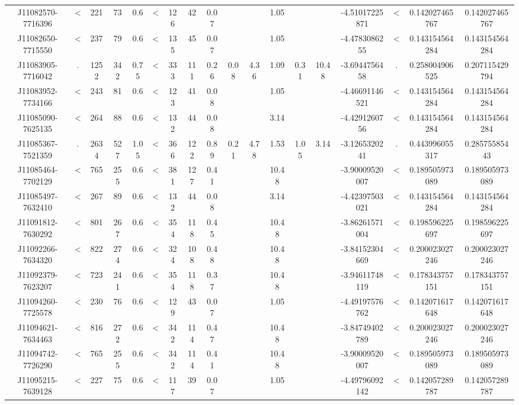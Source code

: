 \begin{table}
\begin{tabular}{cccccccccccccccccc}
J11082570-7716396 & < & 221 & 73 & 0.6 & < & 126 & 42 & 0.07 &  &  & 1.05 &  &  & -4.51017225871 & < & 0.142027465767 & 0.142027465767 \\
J11082650-7715550 & < & 237 & 79 & 0.6 & < & 135 & 45 & 0.07 &  &  & 1.05 &  &  & -4.4783086255 & < & 0.143154564284 & 0.143154564284 \\
J11083905-7716042 & . & 1252 & 342 & 0.75 & < & 333 & 111 & 0.26 & 0.08 & 4.36 & 1.09 & 0.31 & 10.48 & -3.6944756458 & . & 0.258004906525 & 0.207115429794 \\
J11083952-7734166 & < & 243 & 81 & 0.6 & < & 123 & 41 & 0.08 &  &  & 1.05 &  &  & -4.46691146521 & < & 0.143154564284 & 0.143154564284 \\
J11085090-7625135 & < & 264 & 88 & 0.6 & < & 132 & 44 & 0.08 &  &  & 3.14 &  &  & -4.4291260756 & < & 0.143154564284 & 0.143154564284 \\
J11085367-7521359 & . & 2634 & 527 & 1.05 & < & 366 & 122 & 0.89 & 0.21 & 4.78 & 1.53 & 1.05 & 3.14 & -3.1265320241 & . & 0.443996055317 & 0.28575585443 \\
J11085464-7702129 & < & 765 & 255 & 0.6 & < & 381 & 127 & 0.41 &  &  & 10.48 &  &  & -3.90009520007 & < & 0.189505973089 & 0.189505973089 \\
J11085497-7632410 & < & 267 & 89 & 0.6 & < & 132 & 44 & 0.08 &  &  & 3.14 &  &  & -4.42397503021 & < & 0.143154564284 & 0.143154564284 \\
J11091812-7630292 & < & 801 & 267 & 0.6 & < & 354 & 118 & 0.45 &  &  & 10.48 &  &  & -3.86261571004 & < & 0.198596225697 & 0.198596225697 \\
J11092266-7634320 & < & 822 & 274 & 0.6 & < & 324 & 108 & 0.48 &  &  & 10.48 &  &  & -3.84152304669 & < & 0.200023027246 & 0.200023027246 \\
J11092379-7623207 & < & 723 & 241 & 0.6 & < & 354 & 118 & 0.37 &  &  & 10.48 &  &  & -3.94611748119 & < & 0.178343757151 & 0.178343757151 \\
J11094260-7725578 & < & 230 & 76 & 0.6 & < & 129 & 43 & 0.07 &  &  & 1.05 &  &  & -4.49197576762 & < & 0.142071617648 & 0.142071617648 \\
J11094621-7634463 & < & 816 & 272 & 0.6 & < & 342 & 114 & 0.47 &  &  & 10.48 &  &  & -3.84749402789 & < & 0.200023027246 & 0.200023027246 \\
J11094742-7726290 & < & 765 & 255 & 0.6 & < & 342 & 114 & 0.41 &  &  & 10.48 &  &  & -3.90009520007 & < & 0.189505973089 & 0.189505973089 \\
J11095215-7639128 & < & 227 & 75 & 0.6 & < & 117 & 39 & 0.07 &  &  & 1.05 &  &  & -4.49796092142 & < & 0.142057289787 & 0.142057289787 \\

\end{tabular}
\end{table}
